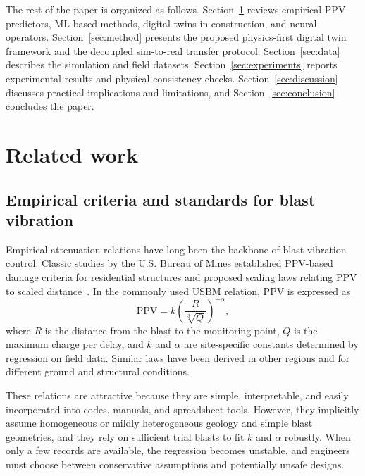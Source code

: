 \documentclass[a4paper,fleqn]{cas-sc}
\begin{document}
The rest of the paper is organized as follows.
Section~\ref{sec:related} reviews empirical PPV predictors, ML-based methods, digital twins in construction, and neural operators.
Section~\ref{sec:method} presents the proposed physics-first digital twin framework
and the decoupled sim-to-real transfer protocol.
Section~\ref{sec:data} describes the simulation and field datasets.
Section~\ref{sec:experiments} reports experimental results and physical consistency checks.
Section~\ref{sec:discussion} discusses practical implications and limitations,
and Section~\ref{sec:conclusion} concludes the paper.

\section{Related work}
\label{sec:related}

\subsection{Empirical criteria and standards for blast vibration}

Empirical attenuation relations have long been the backbone of blast vibration control.
Classic studies by the U.S. Bureau of Mines established PPV-based damage criteria for residential structures
and proposed scaling laws relating PPV to scaled distance~\citep{Duvall1962,Nicholls1971,Siskind1980}.
In the commonly used USBM relation, PPV is expressed as
\begin{equation}
    \mathrm{PPV} = k \left(\frac{R}{\sqrt[3]{Q}}\right)^{-\alpha},
\end{equation}
where $R$ is the distance from the blast to the monitoring point,
$Q$ is the maximum charge per delay,
and $k$ and $\alpha$ are site-specific constants determined by regression on field data.
Similar laws have been derived in other regions and for different ground and structural conditions.

These relations are attractive because they are simple, interpretable,
and easily incorporated into codes, manuals, and spreadsheet tools.
However, they implicitly assume homogeneous or mildly heterogeneous geology and simple blast geometries,
and they rely on sufficient trial blasts to fit $k$ and $\alpha$ robustly.
When only a few records are available, the regression becomes unstable,
and engineers must choose between conservative assumptions and potentially unsafe designs.
\end{document}
